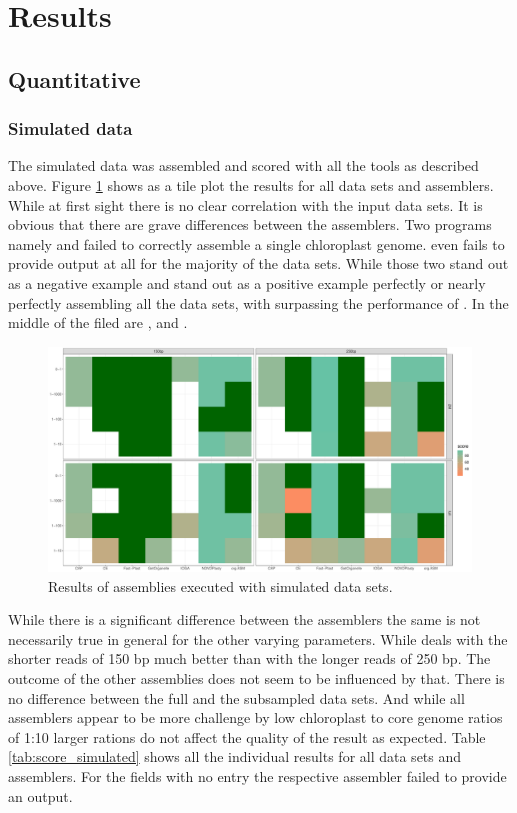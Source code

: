 \section{Results} \label{results:ca}
\subsection{Quantitative}
\subsubsection{Simulated data}

The simulated data was assembled and scored with all the tools as described above. Figure \ref{fig:sim_tiles}
shows as a tile plot the results for all data sets and assemblers. While at first sight there is no clear
correlation with the input data sets. It is obvious that there are grave differences between the
assemblers. Two programs namely \cassp \hspace{0.5ex} and \ioga \hspace{0.5ex}failed to correctly assemble a single chloroplast genome. \ioga
even fails to provide output at all for the majority of the data sets. While those two stand out as a negative
example \fp and \go stand out as a positive example perfectly or nearly perfectly assembling all the data
sets, with \go surpassing the performance of \fp. In the middle of the filed are \ce, \ioga and \oa.


\begin{figure}[H]
\centering
\includegraphics[height=.55\textheight, width=.99\textwidth]{Figures/sim_tiles}
\decoRule
\caption[Score of assemblies of simulated data sets]{Results of assemblies executed with simulated data sets.}
\label{fig:sim_tiles}
\end{figure}

While there is a significant difference between the assemblers the same is not necessarily true in general for
the other varying parameters. While \fp deals with the shorter reads of 150 bp much better than with the longer reads of 250 bp. The outcome of the other assemblies does not seem to be influenced by that. There is no difference between the full and the subsampled data sets. And while all assemblers appear to be more challenge by low chloroplast to core genome ratios of 1:10 larger rations do not affect the quality of the result as expected. 
Table \ref{tab:score_simulated} shows all the individual results for all data sets and assemblers. For the fields with no entry the respective assembler failed to provide an output.


